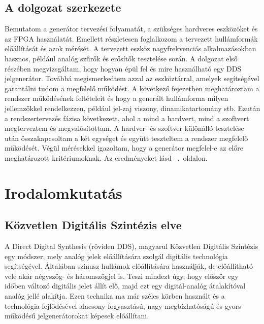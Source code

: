 \documentclass[a4paper,12pt]{article}
\begin{document}
		\subsection{A dolgozat szerkezete}
		Bemutatom a generátor tervezési folyamatát, a szükséges hardveres eszközöket és az FPGA használatát. Emellett részletesen foglalkozom a tervezett hullámformák előállítását és azok mérését. A tervezett eszköz nagyfrekvenciás alkalmazásokban hasznos, például analóg szűrők és erősítők tesztelése során.
		A dolgozat első részében megvizsgáltam, hogy hogyan épül fel és mire használható egy DDS jelgenerátor. Továbbá megismerkedtem azzal az eszköztárral, amelyek segítségével garantálni tudom a megfelelő működést. 
		A következő fejezetben meghatároztam a rendszer működésének feltételeit és hogy a generált hullámforma milyen jellemzőkkel rendelkezzen, például jel-zaj viszony, dinamikatartomány stb.
		Ezután a rendszertervezés fázisa következett, ahol a mind a hardvert, mind a szoftvert megterveztem és megvalósítottam. A hardver- és szoftver különálló tesztelése után összakapcsoltam a két egységet és együtt teszteltem a rendszer megfelelő működését. 
		Végül mérésekkel igazoltam, hogy a generátor megfelel-e az előre meghatározott kritériumoknak. Az eredményeket lásd ~.~oldalon.

	\newpage
	\section{Irodalomkutatás}
	
		\subsection{Közvetlen Digitális Szintézis elve}
		A Direct Digital Synthesis (röviden DDS), magyarul Közvetlen Digitális Szintézis egy módszer, mely analóg jelek előállítására szolgál digitális technológia segítségével. Általában szinusz hullámok előállítására használják, de előállítható vele akár négyszög- és háromszögjel is. Teszi mindezt úgy, hogy először egy időben változó digitális jelet állít elő, majd ezt egy digitál-analóg átalakítóval analóg jellé alakítja. Ezen technika ma már széles körben használt és a technológia fejlődésével alacsony fogyasztású, nagy megbízhatóságú és gyors működésű jelgenerátorokat képesek előállítani.
\end{document}

